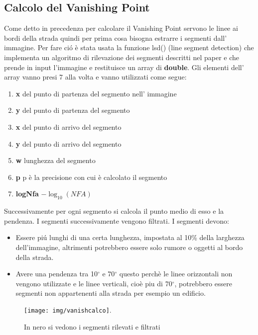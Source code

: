 	\subsection{Calcolo del Vanishing Point}
		Come detto in precedenza per calcolare il Vanishing Point servono le linee ai bordi della strada quindi per prima cosa bisogna estrarre i segmenti dall' immagine. Per fare ci\'o è stata usata la funzione lsd() (line segment detection) che implementa un algoritmo di rilevazione dei segmenti descritti nel paper \cite{lsd} e che prende in input l'immagine e restituisce un array di \textbf{double}.
		Gli elementi dell' array vanno presi 7 alla volta e vanno utilizzati come segue:
		\begin{enumerate}
			\item \textbf{x} del punto di partenza del segmento nell' immagine
			\item \textbf{y} del punto di partenza del segmento
			\item \textbf{x} del punto di arrivo del segmento
			\item \textbf{y} del punto di arrivo del segmento
			\item \textbf{w} lunghezza del segmento
			\item \textbf{p} p è la precisione con cui è calcolato il segmento
			\item \textbf{logNfa} $ - \log_{10}(NFA)$
		\end{enumerate}
		Successivamente per ogni segmento si calcola il punto medio di esso e la pendenza. I segmenti successivamente vengono filtrati.
		I segmenti devono:
		\begin{itemize}
			\item Essere pi\'u lunghi di una certa lunghezza, impostata al 10\% della larghezza dell'immagine, altrimenti potrebbero essere solo rumore o oggetti al bordo della strada.
			\item Avere una pendenza tra 10$^{\circ}$ e 70$^{\circ}$ questo perchè le linee orizzontali non vengono utilizzate e le linee verticali, cioè piu di 70$^{\circ}$, potrebbero essere segmenti non appartenenti alla strada per esempio un edificio.
		\end{itemize}
		\begin{figure}[!ht]
			\centering
			\texttt{[image: img/vanishcalco]}.
			\caption[Segmenti rilevati]{In nero si vedono i segmenti rilevati e filtrati}
		\end{figure}

